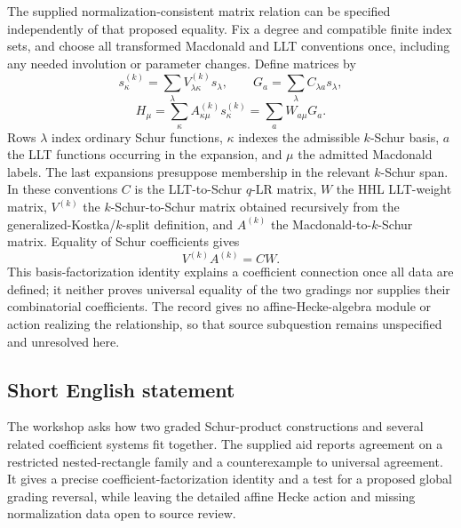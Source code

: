 \documentclass[11pt]{article}
\begin{document}
The supplied normalization-consistent matrix relation can be specified independently of that proposed equality. Fix a degree and compatible finite index sets, and choose all transformed Macdonald and LLT conventions once, including any needed involution or parameter changes. Define matrices by
\[
s^{(k)}_\kappa=\sum_\lambda V^{(k)}_{\lambda\kappa}s_\lambda,
\qquad G_a=\sum_\lambda C_{\lambda a}s_\lambda,
\]
\[
H_\mu=\sum_\kappa A^{(k)}_{\kappa\mu}s^{(k)}_\kappa
=\sum_a W_{a\mu}G_a.
\]
Rows $\lambda$ index ordinary Schur functions, $\kappa$ indexes the admissible $k$-Schur basis, $a$ the LLT functions occurring in the expansion, and $\mu$ the admitted Macdonald labels. The last expansions presuppose membership in the relevant $k$-Schur span. In these conventions $C$ is the LLT-to-Schur $q$-LR matrix, $W$ the HHL LLT-weight matrix, $V^{(k)}$ the $k$-Schur-to-Schur matrix obtained recursively from the generalized-Kostka/$k$-split definition, and $A^{(k)}$ the Macdonald-to-$k$-Schur matrix. Equality of Schur coefficients gives
\[
V^{(k)}A^{(k)}=CW.
\]
This basis-factorization identity explains a coefficient connection once all data are defined; it neither proves universal equality of the two gradings nor supplies their combinatorial coefficients. The record gives no affine-Hecke-algebra module or action realizing the relationship, so that source subquestion remains unspecified and unresolved here.
\subsection{Short English statement}
The workshop asks how two graded Schur-product constructions and several related coefficient systems fit together. The supplied aid reports agreement on a restricted nested-rectangle family and a counterexample to universal agreement. It gives a precise coefficient-factorization identity and a test for a proposed global grading reversal, while leaving the detailed affine Hecke action and missing normalization data open to source review.
\end{document}
